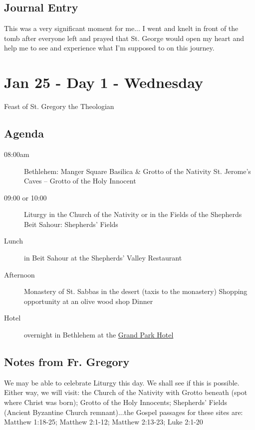 \documentclass[letterpaper]{report}
\begin{document}
\section{Journal Entry}
This was a very significant moment for me... I went and knelt in front of the tomb after everyone left and prayed that St. George would open my heart and help me to see and experience what I'm supposed to on this journey.

\clearpage
\chapter{Jan 25 - Day 1 - Wednesday}
Feast of St. Gregory the Theologian

\section{Agenda}
\begin{description}
	\item[08:00am] Bethlehem: Manger Square
	    \subitem Basilica \& Grotto of the Nativity
	    \subitem St. Jerome's Caves – Grotto of the Holy Innocent
	\item[09:00 or 10:00] Liturgy in the Church of the Nativity or in the 
		Fields of the Shepherds
		\subitem Beit Sahour: Shepherds’ Fields
	\item[Lunch] in Beit Sahour at the Shepherds’ Valley Restaurant 
	\item[Afternoon] Monastery of St. Sabbas in the desert 
	    (taxis to the monastery)
	    \subitem Shopping opportunity at an olive wood shop Dinner 
	    
	\item[Hotel] overnight in Bethlehem at the
	  \href{http://www.grandpark.com/bethlehem/}{Grand Park Hotel}
\end{description}

\section{Notes from Fr. Gregory}
We may be able to celebrate Liturgy this day. We shall see if this is possible. Either way, we will visit: the Church of the Nativity with Grotto beneath (spot where Christ was born); Grotto of the Holy Innocents; Shepherds' Fields (Ancient Byzantine Church remnant)...the Gospel passages for these sites are: 
Matthew 1:18-25; Matthew 2:1-12; Matthew 2:13-23; Luke 2:1-20
\end{document}
